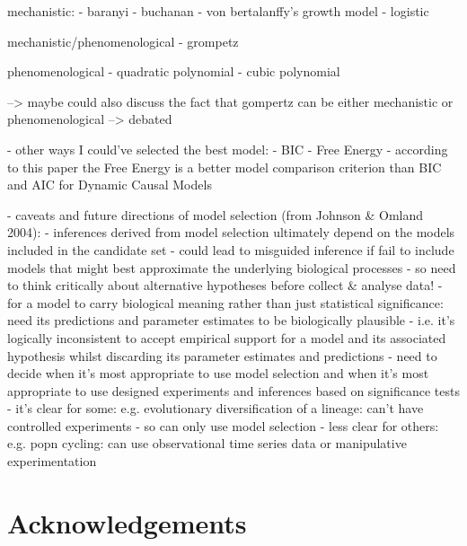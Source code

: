 \documentclass[11pt]{article}
\begin{document}
	mechanistic:
	- baranyi
	- buchanan
	- von bertalanffy's growth model
	- logistic
	
	mechanistic/phenomenological
	- grompetz
	
	phenomenological
	- quadratic polynomial
	- cubic polynomial
	
	--> maybe could also discuss the fact that gompertz can be either mechanistic or phenomenological --> debated
	
	- other ways I could've selected the best model:
	- BIC
	- Free Energy - according to this paper the Free Energy is a better model comparison criterion than BIC and AIC for Dynamic Causal Models \cite{penny2012comparing}
	
	- caveats and future directions of model selection (from Johnson & Omland 2004): \cite{johnson2004model}
	- inferences derived from model selection ultimately depend on the models included in the candidate set
	- could lead to misguided inference if fail to include models that might best approximate the underlying biological processes
	- so need to think critically about alternative hypotheses before collect & analyse data!
	- for a model to carry biological meaning rather than just statistical significance: need its predictions and parameter estimates to be biologically plausible
	- i.e. it's logically inconsistent to accept empirical support for a model and its associated hypothesis whilst discarding its parameter estimates and predictions
	- need to decide when it's most appropriate to use model selection and when it's most appropriate to use designed experiments and inferences based on significance tests
	- it's clear for some: e.g. evolutionary diversification of a lineage: can't have controlled experiments - so can only use model selection 
	- less clear for others: e.g. popn cycling: can use observational time series data or manipulative experimentation
	
	
	
	\section{Acknowledgements}
	
	
	
\end{document}

